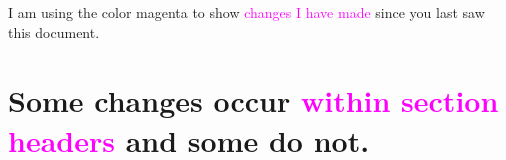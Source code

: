 \documentclass[11pt]{article}
\newcommand{\revised}[1]{\textcolor{magenta}{#1}}
\begin{document}
I am using the color magenta to show \revised{changes I have made} since you last saw this document.

\section*{Some changes occur \revised{within section headers} and some do not.}
\end{document}
